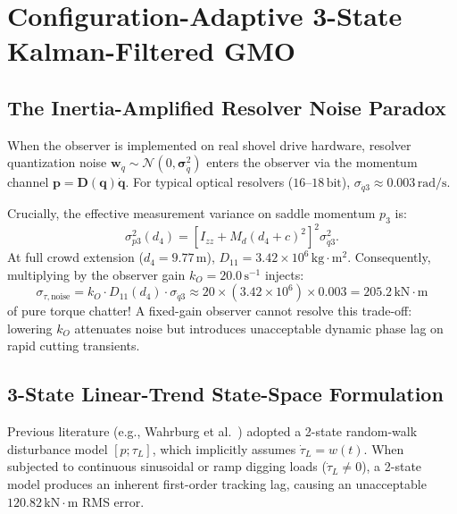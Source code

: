 \documentclass[journal]{IEEEtran}
\begin{document}
\section{Configuration-Adaptive 3-State Kalman-Filtered GMO}

\subsection{The Inertia-Amplified Resolver Noise Paradox}
When the observer is implemented on real shovel drive hardware, resolver quantization noise $\bm{w}_{\dot{q}} \sim \mathcal{N}(0, \bm{\sigma}_{\dot{q}}^2)$ enters the observer via the momentum channel $\bm{p} = \bm{D}(\bm{q})\dot{\bm{q}}$. For typical optical resolvers ($16\text{--}18\,\mathrm{bit}$), $\sigma_{\dot{q}3} \approx 0.003\,\mathrm{rad/s}$.

Crucially, the effective measurement variance on saddle momentum $p_3$ is:
\begin{equation}
\sigma_{p3}^2(d_4) = \left[I_{zz} + M_d (d_4+c)^2\right]^2 \sigma_{\dot{q}3}^2.
\end{equation}
At full crowd extension ($d_4 = 9.77\,\mathrm{m}$), $D_{11} = 3.42\times 10^6\,\mathrm{kg\cdot m^2}$. Consequently, multiplying by the observer gain $k_O = 20.0\,\mathrm{s^{-1}}$ injects:
\begin{equation}
\sigma_{\tau,\mathrm{noise}} = k_O \cdot D_{11}(d_4) \cdot \sigma_{\dot{q}3} \approx 20 \times (3.42\times 10^6) \times 0.003 = 205.2\,\mathrm{kN\cdot m}
\end{equation}
of pure torque chatter! A fixed-gain observer cannot resolve this trade-off: lowering $k_O$ attenuates noise but introduces unacceptable dynamic phase lag on rapid cutting transients.

\subsection{3-State Linear-Trend State-Space Formulation}
Previous literature (e.g., Wahrburg et al.~\cite{wahrburg2015}) adopted a 2-state random-walk disturbance model $[p; \tau_L]$, which implicitly assumes $\dot{\tau}_L = w(t)$. When subjected to continuous sinusoidal or ramp digging loads ($\dot{\tau}_L \ne 0$), a 2-state model produces an inherent first-order tracking lag, causing an unacceptable $120.82\,\mathrm{kN\cdot m}$ RMS error.
\end{document}
